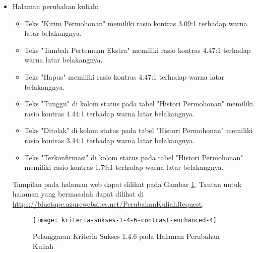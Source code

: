 \begin{itemize}
    \item Halaman perubahan kuliah: 
    \begin{itemize}
        \item Teks "Kirim Permohonan" memiliki rasio kontras 3.09:1 terhadap warna latar belakangnya.
        \item Teks "Tambah Pertemuan Ekstra" memiliki rasio kontras 4.47:1 terhadap warna latar belakangnya.
        \item Teks "Hapus" memiliki rasio kontras 4.47:1 terhadap warna latar belakangnya. 
        \item Teks "Tunggu" di kolom status pada tabel "Histori Permohonan" memiliki rasio kontras 4.44:1 terhadap warna latar belakangnya.
        \item Teks "Ditolak" di kolom status pada tabel "Histori Permohonan" memiliki rasio kontras 3.44:1 terhadap warna latar belakangnya.
        \item Teks "Terkonfirmasi" di kolom status pada tabel "Histori Permohonan" memiliki rasio kontras 1.79:1 terhadap warna latar belakangnya.
    \end{itemize}
    Tampilan pada halaman web dapat dilihat pada Gambar \ref{fig:1.4.6_contrast_enchanced_4}. Tautan untuk halaman yang bermasalah dapat dilihat di \url{https://bluetape.azurewebsites.net/PerubahanKuliahRequest}.
    \begin{figure}[H]
        \centering  
        \texttt{[image: kriteria-sukses-1-4-6-contrast-enchanced-4]}  
        \caption[Pelanggaran Kriteria Sukses 1.4.6 pada Halaman Perubahan Kuliah]{Pelanggaran Kriteria Sukses 1.4.6 pada Halaman Perubahan Kuliah}
        \label{fig:1.4.6_contrast_enchanced_4}  
    \end{figure} 
    

\end{itemize}
